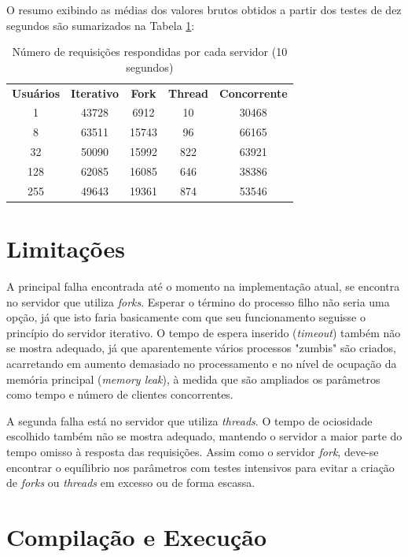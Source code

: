 \documentclass[a4paper, 12pt]{article}
\begin{document}
O resumo exibindo as médias dos valores brutos obtidos a partir dos testes de dez segundos são sumarizados na Tabela \ref{tab:exampleTab1}:

\begin{table}[H]
    \centering
    \caption{Número de requisições respondidas por cada servidor (10 segundos)}\vspace{0.3cm}
    \label{tab:exampleTab1}
    \begin{tabular}{c|c|c|c|c}
     \textbf{Usuários} & \textbf{Iterativo} & \textbf{Fork} & \textbf{Thread} & \textbf{Concorrente}\\
     1 & 43728 & 6912 & 10 & 30468\\
     8 & 63511 & 15743 & 96 & 66165\\
     32 & 50090 & 15992 & 822 & 63921\\
     128 & 62085 & 16085 & 646 & 38386\\
     255 & 49643 & 19361 & 874 & 53546
    \end{tabular}
\end{table}

\section{Limitações}

A principal falha encontrada até o momento na implementação atual, se encontra no servidor que utiliza \emph{forks}. Esperar o término do processo filho não seria uma opção, já que isto faria basicamente com que seu funcionamento seguisse o princípio do servidor iterativo. O tempo de espera inserido (\emph{timeout}) também não se mostra adequado, já que aparentemente vários processos "zumbis" são criados, acarretando em aumento demasiado no processamento e no nível de ocupação da memória principal (\emph{memory leak}), à medida que são ampliados os parâmetros como tempo e número de clientes concorrentes.

A segunda falha está no servidor que utiliza \emph{threads}. O tempo de ociosidade escolhido também não se mostra adequado, mantendo o servidor a maior parte do tempo omisso à resposta das requisições. Assim como o servidor \emph{fork}, deve-se encontrar o equílibrio nos parâmetros com testes intensivos para evitar a criação de \emph{forks} ou \emph{threads} em excesso ou de forma escassa.

\section{Compilação e Execução}
\end{document}
